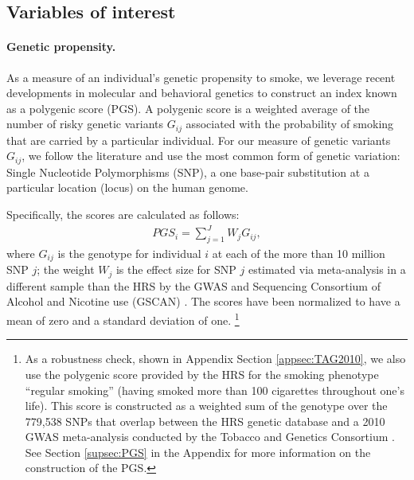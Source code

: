 \documentclass[11pt]{article}
\begin{document}
\subsection{Variables of interest}\label{sec:vars}

\paragraph{Genetic propensity.}
As a measure of an individual's genetic propensity to smoke, we leverage recent developments in molecular and behavioral genetics to construct an index known as a polygenic score (PGS).
A polygenic score is a weighted average of the number of risky genetic variants $G_{ij}$ associated with the probability of smoking that are carried by a particular individual.
For our measure of genetic variants $G_{ij}$, we follow the literature and use the most common form of genetic variation: Single Nucleotide Polymorphisms (SNP), a one base-pair substitution at a particular location (locus) on the human genome.

Specifically, the scores are calculated as follows:
\begin{align}
\label{eq:PGS}
PGS_i = \sum_{j=1}^{J} W_j G_{ij},
\end{align}
\normalsize where $G_{ij}$ is the genotype for individual $i$ at each of the more than 10 million SNP $j$; the weight $W_j$ is the effect size for SNP $j$ estimated via meta-analysis in a different sample than the HRS by the GWAS and Sequencing Consortium of Alcohol and Nicotine use (GSCAN) \citep{GSCAN2019gwas}.
The scores have been normalized to have a mean of zero and a standard deviation of one.%
\footnote{As a robustness check, shown in Appendix Section \ref{appsec:TAG2010}, we also use the polygenic score provided by the HRS \citep{HRSPGenscore2017} for the smoking phenotype ``regular smoking'' (having smoked more than 100 cigarettes throughout one's life).
This score is constructed as a weighted sum of the genotype over the 779,538 SNPs that overlap between the HRS genetic database and a 2010 GWAS meta-analysis conducted by the Tobacco and Genetics Consortium \citep{TAG2010}.
See Section \ref{supsec:PGS} in the Appendix for more information on the construction of the PGS.}
\end{document}

